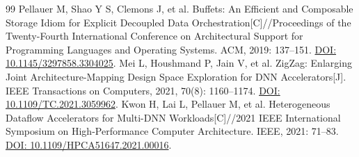 \begin{thebibliography}{99}
 Pellauer M, Shao Y S, Clemons J, et al. Buffets: An Efficient and Composable Storage Idiom for Explicit Decoupled Data Orchestration[C]//Proceedings of the Twenty-Fourth International Conference on Architectural Support for Programming Languages and Operating Systems. ACM, 2019: 137--151. \href{https://doi.org/10.1145/3297858.3304025}{DOI: 10.1145/3297858.3304025}.
 Mei L, Houshmand P, Jain V, et al. ZigZag: Enlarging Joint Architecture-Mapping Design Space Exploration for DNN Accelerators[J]. IEEE Transactions on Computers, 2021, 70(8): 1160--1174. \href{https://doi.org/10.1109/TC.2021.3059962}{DOI: 10.1109/TC.2021.3059962}.
 Kwon H, Lai L, Pellauer M, et al. Heterogeneous Dataflow Accelerators for Multi-DNN Workloads[C]//2021 IEEE International Symposium on High-Performance Computer Architecture. IEEE, 2021: 71--83. \href{https://doi.org/10.1109/HPCA51647.2021.00016}{DOI: 10.1109/HPCA51647.2021.00016}.
\end{thebibliography}
